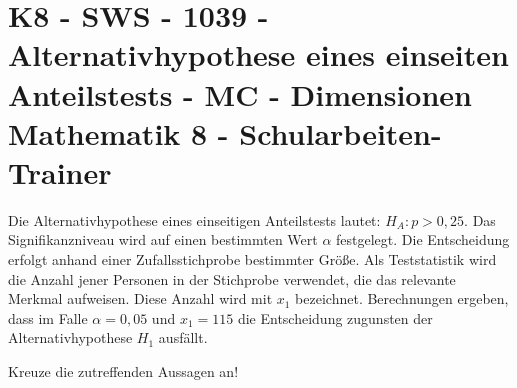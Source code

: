 \section{K8 - SWS - 1039 - Alternativhypothese eines einseiten Anteilstests - MC - Dimensionen Mathematik 8 - Schularbeiten-Trainer}

\begin{beispiel}[K8 - SWS]{1}
Die Alternativhypothese eines einseitigen Anteilstests lautet: $H_A\!:p>0,25$. Das Signifikanzniveau wird auf einen bestimmten Wert $\alpha$ festgelegt. Die Entscheidung erfolgt anhand einer Zufallsstichprobe bestimmter Größe. Als Teststatistik wird die Anzahl jener Personen in der Stichprobe verwendet, die das relevante Merkmal aufweisen. Diese Anzahl wird mit $x_1$ bezeichnet. Berechnungen ergeben, dass im Falle $\alpha=0,05$ und $x_1=115$ die Entscheidung zugunsten der Alternativhypothese $H_1$ ausfällt.

Kreuze die zutreffenden Aussagen an!

\end{beispiel}